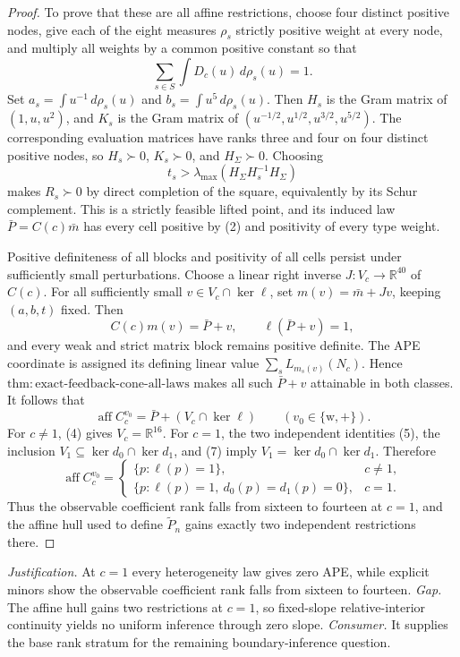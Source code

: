\documentclass{article}
\begin{document}
\begin{proof}
To prove that these are all affine restrictions, choose four distinct positive nodes, give each of the eight measures \(\rho_s\) strictly positive weight at every node, and multiply all weights by a common positive constant so that
\[
 \sum_{s\in S}\int D_c(u)\,d\rho_s(u)=1. \tag{9}
\]
Set \(a_s=\int u^{-1}\,d\rho_s(u)\) and \(b_s=\int u^5\,d\rho_s(u)\).  Then \(H_s\) is the Gram matrix of \((1,u,u^2)\), and \(K_s\) is the Gram matrix of \((u^{-1/2},u^{1/2},u^{3/2},u^{5/2})\).  The corresponding evaluation matrices have ranks three and four on four distinct positive nodes, so \(H_s\succ0\), \(K_s\succ0\), and \(H_\Sigma\succ0\).  Choosing
\[
 t_s>\lambda_{\max}(H_\Sigma H_s^{-1}H_\Sigma)
\]
makes \(R_s\succ0\) by direct completion of the square, equivalently by its Schur complement.  This is a strictly feasible lifted point, and its induced law \(\bar P=C(c)\bar m\) has every cell positive by (2) and positivity of every type weight.

Positive definiteness of all blocks and positivity of all cells persist under sufficiently small perturbations.  Choose a linear right inverse \(J:V_c\to\mathbb R^{40}\) of \(C(c)\).  For all sufficiently small \(v\in V_c\cap\ker\ell\), set \(m(v)=\bar m+Jv\), keeping \((a,b,t)\) fixed.  Then
\[
 C(c)m(v)=\bar P+v,
 \qquad \ell(\bar P+v)=1,
\]
and every weak and strict matrix block remains positive definite.  The APE coordinate is assigned its defining linear value \(\sum_sL_{m_s(v)}(N_c)\).  Hence \(\mathrm{thm{:}exact\text{-}feedback\text{-}cone\text{-}all\text{-}laws}\) makes all such \(\bar P+v\) attainable in both classes.  It follows that
\[
 \operatorname{aff}C_c^{v_0}=\bar P+(V_c\cap\ker\ell)
 \qquad(v_0\in\{\mathrm w,+\}). \tag{10}
\]
For \(c\ne1\), (4) gives \(V_c=\mathbb R^{16}\).  For \(c=1\), the two independent identities (5), the inclusion \(V_1\subseteq\ker d_0\cap\ker d_1\), and (7) imply \(V_1=\ker d_0\cap\ker d_1\).  Therefore
\[
 \operatorname{aff}C_c^{v_0}=
 \begin{cases}
 \{p:\ell(p)=1\},&c\ne1,\\
 \{p:\ell(p)=1,\ d_0(p)=d_1(p)=0\},&c=1.
 \end{cases} \tag{11}
\]
Thus the observable coefficient rank falls from sixteen to fourteen at \(c=1\), and the affine hull used to define \(\widetilde P_n\) gains exactly two independent restrictions there.
\end{proof}
\par\smallskip\noindent \textit{Justification.} At \(c=1\) every heterogeneity law gives zero APE, while explicit minors show the observable coefficient rank falls from sixteen to fourteen. \textit{Gap.} The affine hull gains two restrictions at \(c=1\), so fixed-slope relative-interior continuity yields no uniform inference through zero slope. \textit{Consumer.} It supplies the base rank stratum for the remaining boundary-inference question.
\end{document}
